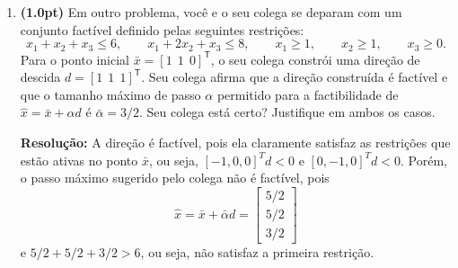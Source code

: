\documentclass{article}
\newcommand{\T}{\mathsf{T}}
\begin{document}
\begin{enumerate}[resume*=exerc]
\begin{enumerate}[label=(\alph*),series=q4]
\item {\bf (1.0pt)} Em outro problema, você e o seu colega se deparam com um conjunto factível definido pelas seguintes restrições:
\[
  x_1 + x_2 + x_3 \leq 6, \qquad  x_1 + 2x_2 + x_3 \leq 8, \qquad x_1 \geq 1, \qquad x_2 \geq 1, \qquad x_3 \geq 0.
\]
Para o ponto inicial $\bar x = [1~~1~~0]^\T$, o seu colega constrói uma direção de descida $d = [1~~1~~1]^\T$. Seu colega afirma que a direção construída é factível e que o tamanho máximo de passo $\alpha$ permitido para a factibilidade de $\hat x = \bar x + \alpha d$ é $\bar \alpha = 3/2$. Seu colega está certo? Justifique em ambos os casos.
\begin{framed}
{\bf Resolução:}
A direção é factível, pois ela claramente satisfaz as restrições que estão ativas no ponto $\bar x$, ou seja, $[-1, 0, 0]^T d < 0$ e $[0, -1, 0]^T d < 0$. Porém, o passo máximo sugerido pelo colega não é factível, pois
\[\hat x = \bar x + \bar\alpha d = \begin{bmatrix} 5/2\\ 5/2\\ 3/2\end{bmatrix}\]
e $5/2+5/2+3/2 > 6$, ou seja, não satisfaz a primeira restrição.
\vspace{8cm}
\end{framed}
\end{enumerate}
\end{enumerate}

\pagebreak
\end{document}
